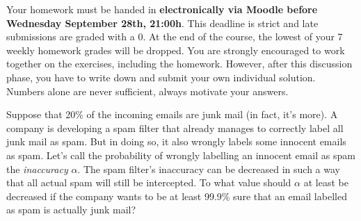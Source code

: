 \documentclass[a4paper,10pt,landscape,twocolumn]{scrartcl}
\newcommand\deadline{Wednesday September 28th, 21:00h}
\begin{document}
\homeworkproblems

{\sffamily\noindent
Your homework must be handed in \textbf{electronically via Moodle before \deadline}.  This deadline is strict and late submissions are graded with a 0. At the end of the course, the lowest of your 7 weekly homework grades will be dropped. You are strongly encouraged to work together on the exercises, including the homework. However, after this discussion phase, you have to write down and submit your own individual solution. Numbers alone are never sufficient, always motivate your answers.
}



\begin{exercise}
	Suppose that 20\% of the incoming emails are junk mail (in fact, it's more). A company is developing a spam filter that already manages to correctly label all junk mail as spam. But in doing so, it also wrongly labels some innocent emails as spam. Let's call the probability of wrongly labelling an innocent email as spam the \emph{inaccuracy} $\alpha$. 
%	
	The spam filter's inaccuracy can be decreased in such a way that all actual spam will still be intercepted. To what value should $\alpha$ at least be decreased if the company wants to be at least 99.9\% sure that an email labelled as spam is actually junk mail?
\end{exercise}
\end{document}
